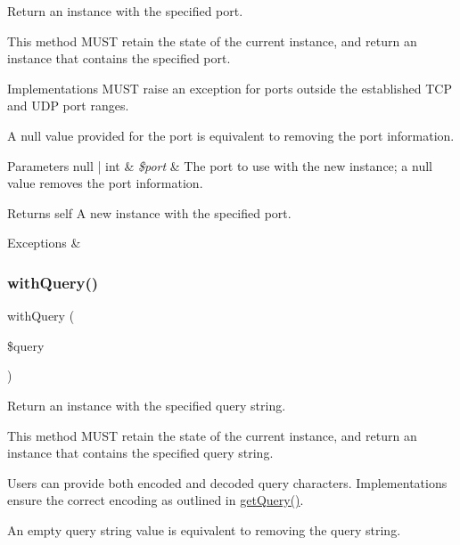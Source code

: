Return an instance with the specified port.

This method M\+U\+ST retain the state of the current instance, and return an instance that contains the specified port.

Implementations M\+U\+ST raise an exception for ports outside the established T\+CP and U\+DP port ranges.

A null value provided for the port is equivalent to removing the port information.


\begin{DoxyParams}[1]{Parameters}
null | int & {\em \$port} & The port to use with the new instance; a null value removes the port information. \\
\hline
\end{DoxyParams}
\begin{DoxyReturn}{Returns}
self A new instance with the specified port. 
\end{DoxyReturn}

\begin{DoxyExceptions}{Exceptions}
{\em } & \\
\hline
\end{DoxyExceptions}
\mbox{\label{class_pes_1_1_http_1_1_uri_a7a6777fe7fccfc7dafd62fcbe09169de}} 
\subsubsection{\texorpdfstring{with\+Query()}{withQuery()}}
{\footnotesize\ttfamily with\+Query (\begin{DoxyParamCaption}\item[{}]{\$query }\end{DoxyParamCaption})}

Return an instance with the specified query string.

This method M\+U\+ST retain the state of the current instance, and return an instance that contains the specified query string.

Users can provide both encoded and decoded query characters. Implementations ensure the correct encoding as outlined in \mbox{\hyperlink{class_pes_1_1_http_1_1_uri_a55f162785567258fe5138af282e588c2}{get\+Query()}}.

An empty query string value is equivalent to removing the query string.


